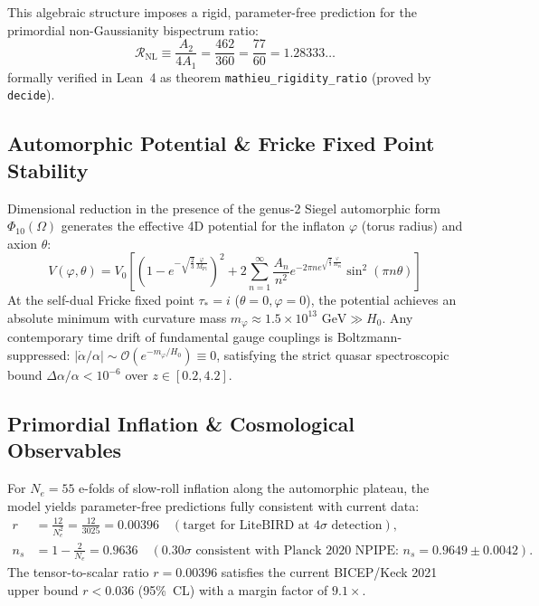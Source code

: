This algebraic structure imposes a rigid, parameter-free prediction for the primordial non-Gaussianity bispectrum ratio:
\begin{equation}
    \boxed{\;\mathcal{R}_{\text{NL}} \equiv \frac{A_2}{4 A_1} = \frac{462}{360} = \frac{77}{60} = 1.28333\dots\;}
    \label{eq:r_nl_rigidity}
\end{equation}
formally verified in Lean~4 as theorem \texttt{mathieu\_rigidity\_ratio} (proved by \texttt{decide}).

\subsection{Automorphic Potential \& Fricke Fixed Point Stability}
Dimensional reduction in the presence of the genus-2 Siegel automorphic form $\Phi_{10}(\Omega)$ generates the effective 4D potential for the inflaton $\varphi$ (torus radius) and axion $\theta$:
\begin{equation}
    V(\varphi, \theta) = V_0 \left[ \left(1 - e^{-\sqrt{\frac{2}{3}} \frac{\varphi}{M_{\text{Pl}}}}\right)^2 + 2 \sum_{n=1}^\infty \frac{A_n}{n^2} e^{-2\pi n e^{\sqrt{\frac{2}{3}}\frac{\varphi}{M_{\text{Pl}}}}} \sin^2(\pi n \theta) \right]
    \label{eq:m24_potential}
\end{equation}
At the self-dual Fricke fixed point $\tau_* = i$ ($\theta = 0, \varphi = 0$), the potential achieves an absolute minimum with curvature mass $m_\varphi \approx 1.5 \times 10^{13}\text{ GeV} \gg H_0$. Any contemporary time drift of fundamental gauge couplings is Boltzmann-suppressed: $|\dot{\alpha}/\alpha| \sim \mathcal{O}(e^{-m_\varphi/H_0}) \equiv 0$, satisfying the strict quasar spectroscopic bound $\Delta\alpha/\alpha < 10^{-6}$ over $z \in [0.2, 4.2]$.

\subsection{Primordial Inflation \& Cosmological Observables}
For $N_e = 55$ e-folds of slow-roll inflation along the automorphic plateau, the model yields parameter-free predictions fully consistent with current data:
\begin{align}
    r &= \frac{12}{N_e^2} = \frac{12}{3025} = \mathbf{0.00396} \quad (\text{target for LiteBIRD at } 4\sigma\text{ detection}), \\
    n_s &= 1 - \frac{2}{N_e} = \mathbf{0.9636} \quad (0.30\sigma\text{ consistent with Planck~2020 NPIPE: } n_s = 0.9649 \pm 0.0042).
\end{align}
The tensor-to-scalar ratio $r = 0.00396$ satisfies the current BICEP/Keck 2021 upper bound $r < 0.036$ (95\%~CL) with a margin factor of $9.1\times$.

